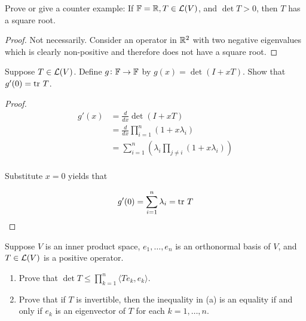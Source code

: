 \documentclass{extarticle}
\begin{document}
\begin{problem}{11}
    Prove or give a counter example: If \(\mathbb{F} = \mathbb{R}, T \in \mathcal{L}(V)\), and \(\det T > 0\), then 
    \(T\) has a square root. 
\end{problem}

\begin{proof}
Not necessarily. Consider an operator in \(\mathbb{R}^2\) with two negative eigenvalues which is clearly 
non-positive and therefore does not have a square root. 
\end{proof}

\begin{problem}{16}
    Suppose \(T \in \mathcal{L}(V)\). Define \(g \colon \mathbb{F} \to \mathbb{F}\) by \(g(x) = \det (I + xT)\). Show 
    that \(g'(0) = \text{tr} \ T\). 
\end{problem}

\begin{proof}
\begin{align*}
    g'(x) &= \frac{d}{dx} \det (I + x T) \\ 
    &= \frac{d}{dx} \prod_{i=1}^{n} (1 + x \lambda_i) \\ 
    &= \sum_{i=1}^{n} \left( \lambda_i \prod_{j \neq i} \left( 1 + x \lambda_i \right) \right) \\ 
\end{align*}

Substitute \(x = 0\) yields that 

\[g'(0) = \sum_{i=1}^{n} \lambda_i = \tr \ T\]
\end{proof}

\begin{problem}{19}
    Suppose \(V\) is an inner product space, \(e_1, \ldots, e_n\) is an orthonormal basis of \(V\), 
    and \(T \in \mathcal{L}(V)\) is a positive operator. 
    \begin{enumerate}[label=(\alph*)]
        \item Prove that \(\det T \leq \prod_{k=1}^{n} \langle Te_k,e_k \rangle\). 
        \item Prove that if \(T\) is invertible, then the inequality in (a) is an equality if and only 
        if \(e_k\) is an eigenvector of \(T\) for each \(k = 1, \ldots, n\). 
    \end{enumerate}
\end{problem}
\end{document}
